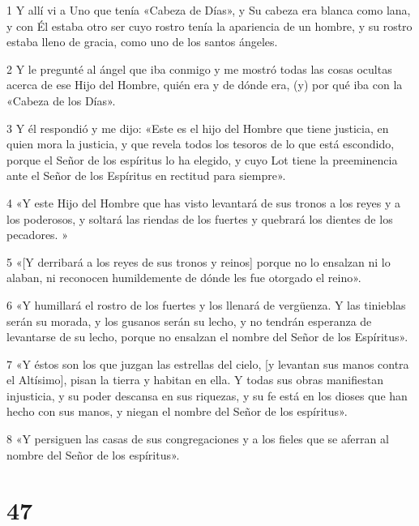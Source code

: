 \par 1 Y allí vi a Uno que tenía «Cabeza de Días», y Su cabeza era blanca como lana, y con Él estaba otro ser cuyo rostro tenía la apariencia de un hombre, y su rostro estaba lleno de gracia, como uno de los santos ángeles.
\par 2 Y le pregunté al ángel que iba conmigo y me mostró todas las cosas ocultas acerca de ese Hijo del Hombre, quién era y de dónde era, (y) por qué iba con la «Cabeza de los Días».
\par 3 Y él respondió y me dijo: «Este es el hijo del Hombre que tiene justicia, en quien mora la justicia, y que revela todos los tesoros de lo que está escondido, porque el Señor de los espíritus lo ha elegido, y cuyo Lot tiene la preeminencia ante el Señor de los Espíritus en rectitud para siempre».
\par 4 «Y este Hijo del Hombre que has visto levantará de sus tronos a los reyes y a los poderosos, y soltará las riendas de los fuertes y quebrará los dientes de los pecadores. »
\par 5 «[Y derribará a los reyes de sus tronos y reinos] porque no lo ensalzan ni lo alaban, ni reconocen humildemente de dónde les fue otorgado el reino».
\par 6 «Y humillará el rostro de los fuertes y los llenará de vergüenza. Y las tinieblas serán su morada, y los gusanos serán su lecho, y no tendrán esperanza de levantarse de su lecho, porque no ensalzan el nombre del Señor de los Espíritus».
\par 7 «Y éstos son los que juzgan las estrellas del cielo, [y levantan sus manos contra el Altísimo], pisan la tierra y habitan en ella. Y todas sus obras manifiestan injusticia, y su poder descansa en sus riquezas, y su fe está en los dioses que han hecho con sus manos, y niegan el nombre del Señor de los espíritus».
\par 8 «Y persiguen las casas de sus congregaciones y a los fieles que se aferran al nombre del Señor de los espíritus».

\chapter{47}

